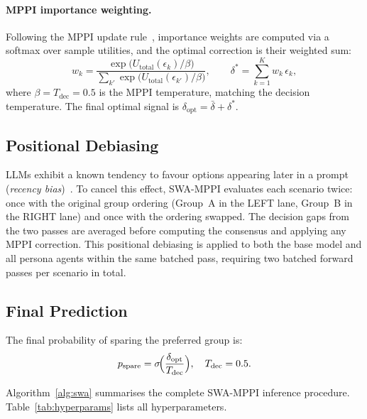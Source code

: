 \documentclass{article}
\begin{document}
\paragraph{MPPI importance weighting.}
Following the MPPI update rule~\citep{williams2017mppi}, importance weights are computed
via a softmax over sample utilities, and the optimal correction is their weighted sum:
\begin{equation}
  w_k = \frac{\exp\!\bigl(U_{\text{total}}(\epsilon_k)/\beta\bigr)}
             {\sum_{k'}\exp\!\bigl(U_{\text{total}}(\epsilon_{k'})/\beta\bigr)},
  \qquad
  \delta^* = \sum_{k=1}^{K} w_k\,\epsilon_k,
  \label{eq:mppi}
\end{equation}
where $\beta = T_{\text{dec}} = 0.5$ is the MPPI temperature, matching the decision
temperature. The final optimal signal is $\delta_{\text{opt}} = \bar{\delta} + \delta^*$.

\subsection{Positional Debiasing}
\label{sec:method:debias}

LLMs exhibit a known tendency to favour options appearing later in a prompt
(\emph{recency bias})~\citep{liu2024lost}. To cancel this effect, SWA-MPPI evaluates
each scenario twice: once with the original group ordering (Group~A in the LEFT lane,
Group~B in the RIGHT lane) and once with the ordering swapped. The decision gaps from
the two passes are averaged before computing the consensus and applying any MPPI
correction. This positional debiasing is applied to both the base model and all persona
agents within the same batched pass, requiring two batched forward passes per scenario in
total.

\subsection{Final Prediction}
\label{sec:method:final}

The final probability of sparing the preferred group is:
\begin{equation}
  p_{\text{spare}}
  = \sigma\!\Bigl(\frac{\delta_{\text{opt}}}{T_{\text{dec}}}\Bigr),
  \quad T_{\text{dec}} = 0.5.
  \label{eq:final}
\end{equation}

Algorithm~\ref{alg:swa} summarises the complete SWA-MPPI inference procedure.
Table~\ref{tab:hyperparams} lists all hyperparameters.
\end{document}
